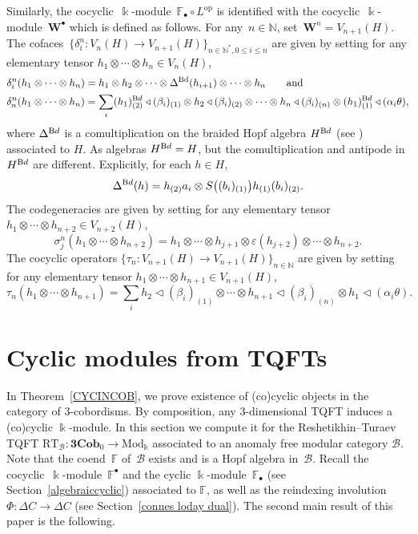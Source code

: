 \documentclass[pdftex]{sigma}
\numberwithin{equation}{section}
\newcommand{\co}{\colon}
\newcommand{\tens}{\otimes}
\newcommand{\mc}{\mathcal}
\newcommand{\opp}{\mathrm{op}}
\newcommand{\N}{\mathbb{N}}
\newcommand{\Mod}{\mathrm{Mod}}
\newcommand{\Cob}{\textbf{Cob}}
\newcommand{\kk}{\Bbbk}
\newcommand{\RT}{\text{RT}}
\newcommand{\coend}{\mathbb{F}}
\newcommand{\ltrn}{\triangleleft}
\begin{document}
Similarly, the cocyclic~$\kk$-module~$\coend_\bullet\circ L^\opp$ is identified with the cocyclic~$\kk$-module~$\textbf{W}^\bullet$ which is defined as follows.
For any~$n\in \N$, set~$\textbf{W}^n = V_{n+1}(H)$.
The cofaces~$\{\delta_i^n \co V_{n}(H) \to V_{n+1}(H)\}_{n\in \N^*, 0\le i \le n}$ are given by setting for any elementary tensor $h_1\otimes\cdots\otimes h_{n} \in V_n(H)$,
\begin{align*}
&\delta_i^n(h_1\otimes\cdots\otimes h_{n})=
	h_1\otimes h_2\otimes\cdots \otimes \Delta^{\text{Bd}}(h_{i+1}) \otimes\cdots \otimes h_{n} \qquad \text{and} \\
	&\delta_n^n(h_1\otimes \cdots\otimes h_{n})=\sum_i (h_1)_{(2)}^{\text Bd} \ltrn (\beta_i)_{(1)}\tens h_2 \ltrn (\beta_i)_{(2)} \tens \cdots \tens h_{n}\ltrn (\beta_i)_{(n)}\tens (h_1)_{(1)}^{\text Bd} \ltrn(\alpha_i\theta),
\end{align*}
where $\Delta^{\text Bd}$ is a comultiplication on the braided Hopf algebra $H^{\text Bd}$ (see \cite[Lemma 4.4]{virelizier_2006}) asso\-ciated to $H$. As algebras $H^{\text Bd}=H$, but the comultiplication and antipode in $H^{\text Bd}$ are different. Explicitly, for each $h\in H$,
\[
\Delta^{\text Bd}(h)=h_{(2)}a_i\tens S\bigl((b_i)_{(1)}\bigr)h_{(1)}(b_i)_{(2)}.
\]
The codegeneracies \smash{$\bigl\{\sigma_j^n \co V_{n+2}(H) \to V_{n+1}(H)\bigr\}_{n \in \N, 0\le j \le n}$} are given by setting for any elementary tensor~$h_1\otimes\cdots\otimes h_{n+2} \in V_{n+2}(H)$,
\[
\sigma_j^n(h_1\otimes \cdots \otimes h_{n+2})=
h_1\otimes\cdots\otimes h_{j+1}\otimes \varepsilon(h_{j+2})\otimes \cdots \otimes h_{n+2}.\]
The cocyclic operators $\{\tau_n \co V_{n+1}(H) \to V_{n+1}(H)\}_{n\in \N}$ are given by setting for any elementary tensor $h_1\otimes\cdots\otimes h_{n+1} \in V_{n+1}(H)$,
\[\tau_n(h_1\tens \cdots \tens h_{n+1})= \sum_i h_2\ltrn (\beta_i)_{(1)}\tens \cdots \tens h_{n+1}\ltrn (\beta_i)_{(n)}\tens h_1 \ltrn(\alpha_i\theta).\]

\section{Cyclic modules from TQFTs}\label{tftsrel}

In Theorem~\ref{CYCINCOB}, we prove existence of (co)cyclic objects in the category of $3$-cobordisms. By composition, any $3$-dimensional TQFT induces a (co)cyclic $\kk$-module.
In this section we compute it for the Reshetikhin--Turaev TQFT $\RT_{\mc B} \co \textbf{3}\Cob_0 \to \Mod_\kk$ associated to an anomaly free modular category $\mc B$. Note that the coend~$\coend$ of~$\mc B$ exists and is a Hopf algebra in~$\mc B$. Recall the cocyclic~$\kk$-module~$\coend^\bullet$ and the cyclic $\kk$-module~$\coend_\bullet$ (see Section~\ref{algebraiccyclic}) associated to $\coend$, as well as the reindexing involution~$\Phi \co \Delta C \to \Delta C$ (see Section~\ref{connes loday dual}).
The second main result of this paper is the following.
\end{document}
